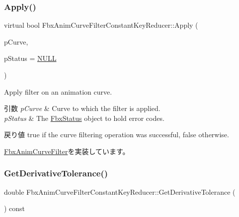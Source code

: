\subsubsection{\texorpdfstring{Apply()}{Apply()}\hspace{0.1cm}{\footnotesize\ttfamily [5/5]}}
{\footnotesize\ttfamily virtual bool Fbx\+Anim\+Curve\+Filter\+Constant\+Key\+Reducer\+::\+Apply (\begin{DoxyParamCaption}\item[{\hyperlink{class_fbx_anim_curve}{Fbx\+Anim\+Curve} \&}]{p\+Curve,  }\item[{\hyperlink{class_fbx_status}{Fbx\+Status} $\ast$}]{p\+Status = {\ttfamily \hyperlink{fbxarch_8h_a070d2ce7b6bb7e5c05602aa8c308d0c4}{N\+U\+LL}} }\end{DoxyParamCaption})\hspace{0.3cm}{\ttfamily [virtual]}}

Apply filter on an animation curve. 
\begin{DoxyParams}{引数}
{\em p\+Curve} & Curve to which the filter is applied. \\
\hline
{\em p\+Status} & The \hyperlink{class_fbx_status}{Fbx\+Status} object to hold error codes. \\
\hline
\end{DoxyParams}
\begin{DoxyReturn}{戻り値}
{\ttfamily true} if the curve filtering operation was successful, {\ttfamily false} otherwise. 
\end{DoxyReturn}


\hyperlink{class_fbx_anim_curve_filter_a6a69996c47c0e6f63a0f8b0d5fa806a0}{Fbx\+Anim\+Curve\+Filter}を実装しています。

\mbox{\label{class_fbx_anim_curve_filter_constant_key_reducer_adae1590528c85fe9c4186652c97d8d19}} 
\subsubsection{\texorpdfstring{Get\+Derivative\+Tolerance()}{GetDerivativeTolerance()}}
{\footnotesize\ttfamily double Fbx\+Anim\+Curve\+Filter\+Constant\+Key\+Reducer\+::\+Get\+Derivative\+Tolerance (\begin{DoxyParamCaption}{ }\end{DoxyParamCaption}) const}

